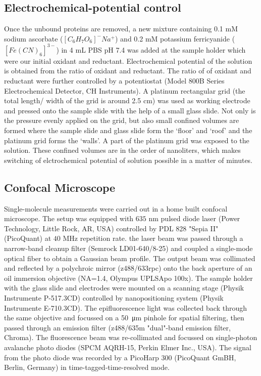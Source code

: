 \documentclass[journal=jacsat,manuscript=article]{achemso}
\begin{document}
\subsection{Electrochemical-potential control}
Once the unbound proteins are removed, a new mixture containing 0.1 mM sodium ascorbate ($[C_6H_7O_6]^-Na^+$) and 0.2 mM potassium ferricyanide ($[Fe(CN)_6]^{3-}$) in 4 mL PBS pH 7.4 was added at the sample holder which were our initial oxidant and reductant. Electrochemical potential of the solution is obtained from the ratio of oxidant and reductant. The ratio of of oxidant and reductant were further controlled by a potentiostat (Model 800B Series Electrochemical Detector, CH Instruments). A platinum rectangular grid (the total length/ width of the grid is around 2.5 cm) was used as working electrode and pressed onto the sample slide with the help of a small glass slide. Not only is the pressure evenly applied on the grid, but also small confined volumes are formed where the sample slide and glass slide form the `floor' and `roof' and the platinum grid forms the `walls'. A part of the platinum grid was exposed to the solution. These confined volumes are in the order of nanoliters, which makes switching of elctrochemical potential of solution possible in a matter of minutes.
\subsection{Confocal Microscope}
Single-molecule measurements were carried out in a home built confocal microscope. The setup was equipped with $635$ nm pulsed diode laser (Power Technology, Little Rock, AR, USA) controlled by PDL 828 "Sepia II" (PicoQuant) at $40$ MHz repetition rate. the laser beam was passed through a narrow-band cleanup filter (Semrock LD01-640/8-25) and coupled a single-mode optical fiber to obtain a Gaussian beam profile. The output beam was collimated and reflected by a polychroic mirror (z488/633rpc) onto the back aperture of an oil immersion objective (NA=1.4, Olympus UPLSApo 100x). The sample holder with the glass slide and electrodes were mounted on a scanning stage (Physik Instrumente P-517.3CD) controlled by nanopositioning system (Physik Instrumente E-710.3CD). The epifluorescence light was collected back through the same objective and focussed on a \SI{50}{\micro\metre} pinhole for spatial filtering, then passed through an emission filter (z488/635m "dual"-band emission filter, Chroma). The fluorescence beam was re-collimated and focussed on single-photon avalanche photo diodes (SPCM AQRH-15, Perkin Elmer Inc., USA). The signal from the photo diode was recorded by a PicoHarp 300 (PicoQuant GmBH, Berlin, Germany) in time-tagged-time-resolved mode.
\end{document}
